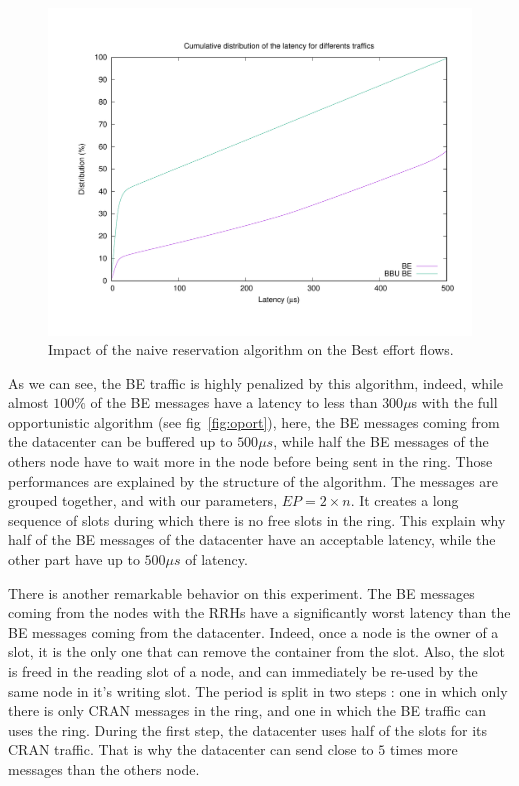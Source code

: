 \documentclass[a4paper,10pt,french,english]{article}
\begin{document}
      \begin{figure}[h]
\centering
      \includegraphics[scale=0.4]{res1.pdf}
     \caption{Impact of the naive reservation algorithm on the Best effort flows.}   \label{fig:res1}
  \end{figure}

As we can see, the BE traffic is highly penalized by this algorithm, indeed, while almost $100\%$ of the BE messages have a latency to less than $300 \mu$s with the full opportunistic algorithm (see fig~\ref{fig:oport}), here, the BE messages coming from the datacenter can be buffered up to $500\mu s$, while half the BE messages of the others node have to wait more in the node before being sent in the ring. Those performances are explained by the structure of the algorithm. The messages are grouped together, and with our parameters, $EP = 2\times n$. It creates a long sequence of slots during which there is no free slots in the ring. This explain why half of the BE messages of the datacenter have an acceptable latency, while the other part have up to $500\mu s$ of latency.

There is another remarkable behavior on this experiment. The BE messages coming from the nodes with the RRHs have a significantly worst latency than the BE messages coming from the datacenter. Indeed, once a node is the owner of a slot, it is the only one that can remove the container from the slot. Also, the slot is freed in the reading slot of a node, and can immediately be re-used by the same node in it's writing slot. The period is split in two steps : one in which only there is only CRAN messages in the ring, and one in which the BE traffic can uses the ring. During the first step, the datacenter uses half of the slots for its CRAN traffic. That is why the datacenter can send close to $5$ times more messages than the others node.
\end{document}
